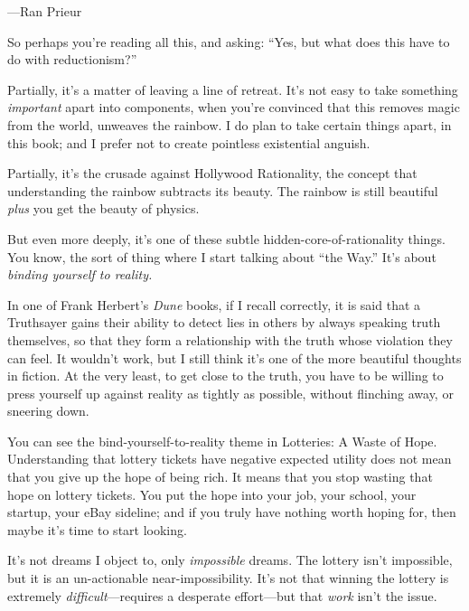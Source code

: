 {\raggedleft
 {}---Ran Prieur
\par}


\bigskip

\myendsectiontext


{
 So perhaps you're reading all this, and asking:
``Yes, but what does this have to do with
reductionism?'' }

{
 Partially, it's a matter of leaving a line of
retreat. It's not easy to take something
\textit{important} apart into components, when you're
convinced that this removes magic from the world, unweaves the rainbow.
I do plan to take certain things apart, in this book; and I prefer not
to create pointless existential anguish.}

{
 Partially, it's the crusade against Hollywood
Rationality, the concept that understanding the rainbow subtracts its
beauty. The rainbow is still beautiful \textit{plus} you get the beauty
of physics.}

{
 But even more deeply, it's one of these subtle
hidden-core-of-rationality things. You know, the sort of thing where I
start talking about ``the Way.''
It's about \textit{binding yourself to reality.}}

{
 In one of Frank Herbert's \textit{Dune} books, if
I recall correctly, it is said that a Truthsayer gains their ability to
detect lies in others by always speaking truth themselves, so that they
form a relationship with the truth whose violation they can feel. It
wouldn't work, but I still think it's
one of the more beautiful thoughts in fiction. At the very least, to
get close to the truth, you have to be willing to press yourself up
against reality as tightly as possible, without flinching away, or
sneering down.}

{
 You can see the bind-yourself-to-reality theme in Lotteries: A
Waste of Hope. Understanding that lottery tickets have negative
expected utility does not mean that you give up the hope of being rich.
It means that you stop wasting that hope on lottery tickets. You put
the hope into your job, your school, your startup, your eBay sideline;
and if you truly have nothing worth hoping for, then maybe
it's time to start looking.}

{
 It's not dreams I object to, only
\textit{impossible} dreams. The lottery isn't
impossible, but it is an un-actionable near-impossibility.
It's not that winning the lottery is extremely
\textit{difficult}{}---requires a desperate effort---but that
\textit{work} isn't the issue.}

